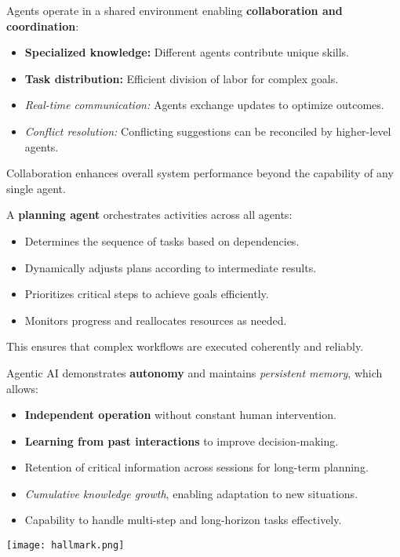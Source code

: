\begin{tcolorbox}[title={3. Collaborative Agent Environment}, colback=orange!5!white, colframe=orange!75!black]
Agents operate in a shared environment enabling \textbf{collaboration and coordination}:  
\begin{itemize}
    \item \textbf{Specialized knowledge:} Different agents contribute unique skills.
    \item \textbf{Task distribution:} Efficient division of labor for complex goals.
    \item \textit{Real-time communication:} Agents exchange updates to optimize outcomes.
    \item \textit{Conflict resolution:} Conflicting suggestions can be reconciled by higher-level agents.
\end{itemize}
Collaboration enhances overall system performance beyond the capability of any single agent.
\end{tcolorbox}
\vspace{0.5cm}

\begin{tcolorbox}[title={4. Planning and Coordination Agent}, colback=red!5!white, colframe=red!75!black]
A \textbf{planning agent} orchestrates activities across all agents:  
\begin{itemize}
    \item Determines the sequence of tasks based on dependencies.
    \item Dynamically adjusts plans according to intermediate results.
    \item Prioritizes critical steps to achieve goals efficiently.
    \item Monitors progress and reallocates resources as needed.
\end{itemize}
This ensures that complex workflows are executed coherently and reliably.
\end{tcolorbox}
\vspace{0.5cm}

\begin{tcolorbox}[title={5. Autonomy and Persistent Memory}, colback=purple!5!white, colframe=purple!75!black]
Agentic AI demonstrates \textbf{autonomy} and maintains \textit{persistent memory}, which allows:  
\begin{itemize}
    \item \textbf{Independent operation} without constant human intervention.
    \item \textbf{Learning from past interactions} to improve decision-making.
    \item Retention of critical information across sessions for long-term planning.
    \item \textit{Cumulative knowledge growth}, enabling adaptation to new situations.
    \item Capability to handle multi-step and long-horizon tasks effectively.
\end{itemize}
\end{tcolorbox}
\vspace{1cm}
\texttt{[image: hallmark.png]}
